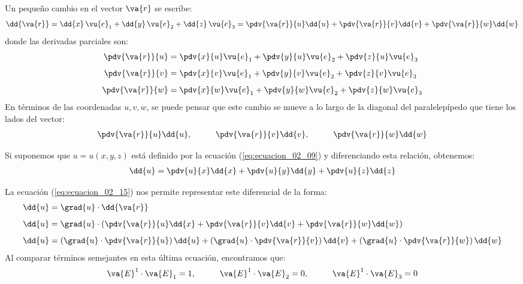 Un pequeño cambio en el vector $\va{r}$ se escribe:
\begin{align}
\dd{\va{r}} = \dd{x} \, \vu{e}_{1} + \dd{y} \, \vu{e}_{2} + \dd{z} \, \vu{e}_{3} = \pdv{\va{r}}{u} \dd{u} + \pdv{\va{r}}{v} \dd{v} + \pdv{\va{r}}{w} \dd{w}
\label{eq:ecuacion_02_15} 
\end{align}
donde las derivadas parciales son:
\begin{align}
\begin{aligned}
\pdv{\va{r}}{u} &= \pdv{x}{u} \vu{e}_{1} + \pdv{y}{u} \vu{e}_{2} + \pdv{z}{u} \vu{e}_{3} \\[0.5em] 
\pdv{\va{r}}{v} &= \pdv{x}{v} \vu{e}_{1} + \pdv{y}{v} \vu{e}_{2} + \pdv{z}{v} \vu{e}_{3} \\[0.5em]
\pdv{\va{r}}{w} &= \pdv{x}{w} \vu{e}_{1} + \pdv{y}{w} \vu{e}_{2} + \pdv{z}{w} \vu{e}_{3}
\end{aligned}
\label{eq:ecuacion_02_16}
\end{align}
En términos de las coordenadas $u, v, w$, se puede pensar que este cambio se mueve a lo largo de la diagonal del paralelepípedo que tiene los lados del vector:
\begin{align*}
\pdv{\va{r}}{u} \dd{u}, \hspace{1cm} \pdv{\va{r}}{v} \dd{v}, \hspace{1cm} \pdv{\va{r}}{w} \dd{w}
\end{align*}

Si suponemos que $u = u(x, y, z)$ está definido por la ecuación (\ref{eq:ecuacion_02_09}) y diferenciando esta relación, obtenemos:
\begin{align}
\dd{u} = \pdv{u}{x} \dd{x} + \pdv{u}{y} \dd{y} + \pdv{u}{z} \dd{z}
\label{eq:ecuacion_02_17}
\end{align}

La ecuación (\ref{eq:ecuacion_02_15}) nos permite representar este diferencial de la forma:
\begin{align}
\begin{aligned}
\dd{u} &= \grad{u} \cdot \dd{\va{r}} \\[0.5em]
\dd{u} &= \grad{u} \cdot \left( \pdv{\va{r}}{u} \dd{x} + \pdv{\va{r}}{v} \dd{v} + \pdv{\va{r}}{w} \dd{w} \right) \\[0.5em]
\dd{u} &= \left( \grad{u} \cdot \pdv{\va{r}}{u} \right) \dd{u} + \left( \grad{u} \cdot \pdv{\va{r}}{v} \right) \dd{v} + \left( \grad{u} \cdot \pdv{\va{r}}{w} \right) \dd{w}
\end{aligned}
\label{eq:ecuacion_02_18}
\end{align}
Al comparar términos semejantes en esta última ecuación, encontramos que:
\begin{align}
\va{E}^{1} \cdot \va{E}_{1} = 1, \hspace{1cm} \va{E}^{1} \cdot \va{E}_{2} = 0, \hspace{1cm} \va{E}^{1} \cdot \va{E}_{3} = 0
\label{eq:ecuacion_02_19}
\end{align}

